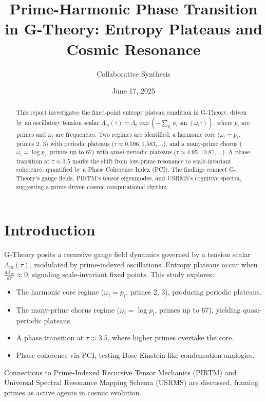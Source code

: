\documentclass[11pt]{article}
\title{Prime-Harmonic Phase Transition in G-Theory: Entropy Plateaus and Cosmic Resonance}
\author{Collaborative Synthesis}
\date{June 17, 2025}
\theoremstyle{definition}
\begin{document}
\maketitle

\begin{abstract}
This report investigates the fixed-point entropy plateau condition in G-Theory, driven by an oscillatory tension scalar \( \Lambda_m(\tau) = \Lambda_0 \exp\left(-\sum_{p_i} a_i \sin(\omega_i \tau)\right) \), where \( p_i \) are primes and \( \omega_i \) are frequencies. Two regimes are identified: a harmonic core (\( \omega_i = p_i \), primes 2, 3) with periodic plateaus (\( \tau \approx 0.596, 1.583, \ldots \)), and a many-prime chorus (\( \omega_i = \log p_i \), primes up to 67) with quasi-periodic plateaus (\( \tau \approx 4.95, 10.87, \ldots \)). A phase transition at \( \tau \approx 3.5 \) marks the shift from low-prime resonance to scale-invariant coherence, quantified by a Phase Coherence Index (PCI). The findings connect G-Theory’s gauge fields, PIRTM’s tensor eigenmodes, and USRMS’s cognitive spectra, suggesting a prime-driven cosmic computational rhythm.
\end{abstract}

\section{Introduction}
G-Theory posits a recursive gauge field dynamics governed by a tension scalar \( \Lambda_m(\tau) \), modulated by prime-indexed oscillations. Entropy plateaus occur when \( \frac{d \Lambda_m}{d \tau} \approx 0 \), signaling scale-invariant fixed points. This study explores:
\begin{itemize}
    \item The harmonic core regime (\( \omega_i = p_i \), primes 2, 3), producing periodic plateaus.
    \item The many-prime chorus regime (\( \omega_i = \log p_i \), primes up to 67), yielding quasi-periodic plateaus.
    \item A phase transition at \( \tau \approx 3.5 \), where higher primes overtake the core.
    \item Phase coherence via PCI, testing Bose-Einstein-like condensation analogies.
\end{itemize}
Connections to Prime-Indexed Recursive Tensor Mechanics (PIRTM) and Universal Spectral Resonance Mapping Schema (USRMS) are discussed, framing primes as active agents in cosmic evolution.
\end{document}
